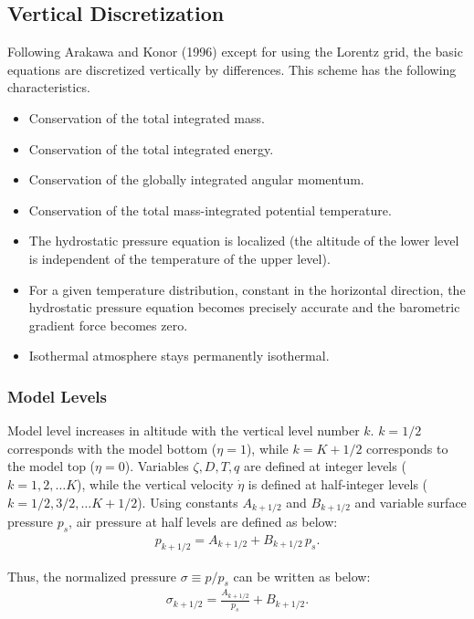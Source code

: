 \hypertarget{vertical-discretization}{%
\subsection{Vertical Discretization}\label{vertical-discretization}}

Following Arakawa and Konor (1996) except for using the Lorentz grid, the basic equations are discretized vertically by differences. This scheme has the following characteristics.

\begin{itemize}
\item
  Conservation of the total integrated mass.
\item
  Conservation of the total integrated energy.
\item
  Conservation of the globally integrated angular momentum.
\item
  Conservation of the total mass-integrated potential temperature.
\item
  The hydrostatic pressure equation is localized (the altitude of the lower level is independent of the temperature of the upper level).
\item
  For a given temperature distribution, constant in the horizontal direction, the hydrostatic pressure equation becomes precisely accurate and the barometric gradient force becomes zero.
\item
  Isothermal atmosphere stays permanently isothermal.
\end{itemize}

\hypertarget{model-levels}{%
\subsubsection{Model Levels}\label{model-levels}}

Model level increases in altitude with the vertical level number \(k\). \(k=1/2\) corresponds with the model bottom (\(\eta=1\)), while \(k=K+1/2\) corresponds to the model top (\(\eta=0\)). Variables
\(\zeta,D,T,q\) are defined at integer levels (\(k=1,2,\ldots K\)), while the vertical velocity \(\dot{\eta}\) is defined at half-integer levels (\(k=1/2,3/2,\ldots K+1/2\)). Using constants
\(A_{k+1/2}\) and \(B_{k+1/2}\) and variable surface pressure \(p_s\), air pressure at half levels are defined as below: \begin{eqnarray}
p_{k+1/2} = A_{k+1/2} +B_{k+1/2}\,p_s.  \end{eqnarray}

Thus, the normalized pressure \(\sigma\equiv p/p_s\) can be written as below: \begin{eqnarray}
\sigma_{k+1/2} = \frac{A_{k+1/2}}{p_s} +B_{k+1/2}.  \end{eqnarray}

